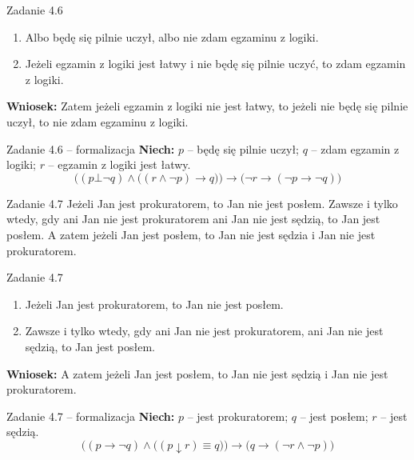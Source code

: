 \documentclass[12pt]{beamer}
\begin{document}
\begin{frame}{Zadanie 4.6}
\begin{enumerate}
    \item[P1.] Albo będę się pilnie uczył, albo nie zdam egzaminu z logiki.
    \item[P2.] Jeżeli egzamin z logiki jest łatwy i nie będę się pilnie uczyć, to zdam egzamin z logiki.
\end{enumerate}
\vspace{6pt}
\textbf{Wniosek:} Zatem jeżeli egzamin z logiki nie jest łatwy, to jeżeli nie będę się pilnie uczył, to nie zdam egzaminu z logiki.
\end{frame}

\begin{frame}{Zadanie 4.6 -- formalizacja}
\textbf{Niech:} $p$ -- będę się pilnie uczył; $q$ -- zdam egzamin z logiki; $r$ -- egzamin z logiki jest łatwy.
\vspace{10pt}
\[ \Big((p \bot \neg q) \wedge \big((r \wedge \neg p) \rightarrow q\big)\Big) \rightarrow \big(\neg r \rightarrow (\neg p \rightarrow \neg q)\big) \]
\end{frame}

\begin{frame}{Zadanie 4.7}
Jeżeli Jan jest prokuratorem, to Jan nie jest posłem. Zawsze i tylko wtedy, gdy ani Jan nie jest prokuratorem ani Jan nie jest sędzią, to Jan jest posłem. A zatem jeżeli Jan jest posłem, to Jan nie jest sędzia i Jan nie jest prokuratorem.
\end{frame}

\begin{frame}{Zadanie 4.7}
\begin{enumerate}
    \item[P1.] Jeżeli Jan jest prokuratorem, to Jan nie jest posłem.
    \item[P2.] Zawsze i tylko wtedy, gdy ani Jan nie jest prokuratorem, ani Jan nie jest sędzią, to Jan jest posłem.
\end{enumerate}
\vspace{6pt}
\textbf{Wniosek:} A zatem jeżeli Jan jest posłem, to Jan nie jest sędzią i Jan nie jest prokuratorem.
\end{frame}

\begin{frame}{Zadanie 4.7 -- formalizacja}
\textbf{Niech:} $p$ -- jest prokuratorem; $q$ -- jest posłem; $r$ -- jest sędzią.
\vspace{10pt}
\[ \Big((p \rightarrow \neg q) \wedge \big((p \downarrow r) \equiv q\big)\Big) \rightarrow \big(q \rightarrow (\neg r \wedge \neg p)\big) \]
\end{frame}
\end{document}
